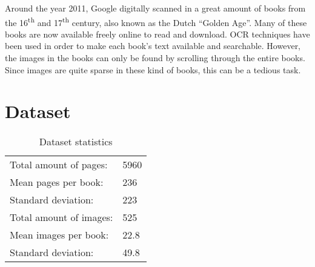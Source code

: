 %
Around the year 2011, Google digitally scanned in a great amount of books from
the 16\textsuperscript{th} and 17\textsuperscript{th} century, also known as the
Dutch ``Golden Age''. Many of these books are now available freely online to
read and download. OCR techniques have been used in order to make each book's
text available and searchable. However, the images in the books can only be
found by scrolling through the entire books. Since images are quite sparse in
these kind of books, this can be a tedious task.



\section{Dataset}

\begin{table}
\centering
\begin{tabular}{l l}
Total amount of pages: & 5960 \\
Mean pages per book: & 236 \\
Standard deviation: & 223 \\
\hline
Total amount of images: & 525 \\
Mean images per book: & 22.8 \\
Standard deviation: & 49.8
\end{tabular}
\caption{Dataset statistics}
\label{tab:statistics}
\end{table}

